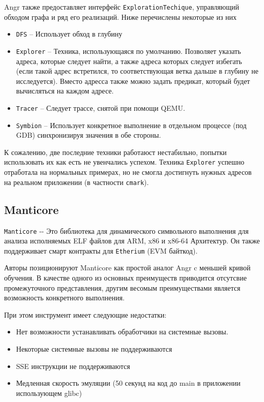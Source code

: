 Angr также предоставляет интерфейс \texttt{ExplorationTechique}, управляющий обходом графа и ряд его реализаций. Ниже перечислены некоторые из них

\begin{itemize}
    \item \texttt{DFS} -- Использует обход в глубину
    \item \texttt{Explorer} -- Техника, использующаяся по умолчанию. Позволяет указать адреса, которые следует найти, а также адреса которых следует избегать (если такой адрес встретился, то соответствующая ветка дальше в глубину не исследуется). Вместо адресса также можно задать предикат, который будет вычисляться на каждом адресе.
    \item \texttt{Tracer} -- Следует трассе, снятой при помощи QEMU.
    \item \texttt{Symbion} -- Использует конкретное выполнение в отдельном процессе (под GDB) синхронизируя значения в обе стороны.
\end{itemize}

К сожалению, две последние техники работаюст нестабильно, попытки использовать их как есть не увенчались успехом. Техника \texttt{Explorer} успешно отработала на нормальных примерах, но не смогла достигнуть нужных адресов на реальном приложении (в частности \texttt{cmark}).


\subsection{Manticore}

\texttt{Manticore} \cite{trailofbits-manticore} ‑- Это библиотека для динамического символьного выполнения для анализа исполняемых ELF файлов для ARM, x86 и x86-64 Архитектур. Он также поддерживает смарт контракты для \texttt{Etherium} (EVM байткод).

Авторы позиционируют Manticore как простой аналог Angr c меньшей кривой обучения. В качестве одного из основных преимуществ приводится отсутсвие промежуточного представления, другим весомым преимуществами является возможность конкретного выполнения.

При этом инструмент имеет следующие недостатки:

\begin{itemize}
    \item Нет возможности устанавливать обработчики на системные вызовы.
    \item Некоторые системные вызовы не поддерживаются
    \item SSE инструкции не поддерживаются
    \item Медленная скорость эмуляции (50 секунд на код до main в приложении использующем glibc)
\end{itemize}



